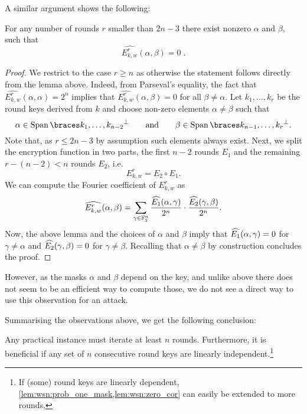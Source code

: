 A similar argument shows the following:
\begin{lemma}\label{lem:wsn:zero_cor}
    For any number of rounds $r$ smaller than $2n-3$ there exist nonzero $\alpha$ and $\beta$, such that
    \begin{equation*}
        \widehat{E_{k,w}^r}(\alpha, \beta) = 0\;.
    \end{equation*}
\end{lemma}
\begin{proof}
    We restrict to the case $r \geqslant n$ as otherwise the statement follows directly from the lemma above.
    Indeed, from Parseval's equality, the fact that $\widehat{E_{k,w}^r}(\alpha, \alpha)=2^n$ implies that $\widehat{E_{k,w}^r}(\alpha, \beta)=0$ for all $\beta \neq \alpha$.
    Let $k_1, \ldots, k_{r}$ be the round keys derived from $k$ and choose non-zero elements $\alpha \ne \beta$ such that
    \begin{equation*}
        \alpha \in \Span{k_1, \dots, k_{n-2}}^{\perp} \qquad
        \text{and} \qquad
        \beta \in \Span{k_{n-1}, \dots, k_{r}}^{\perp}.
    \end{equation*}
    Note that, as $r \le 2n-3$ by assumption such elements always exist.
    Next, we split the encryption function in two parts, the first $n-2$ rounds $E_1$ and the remaining $r-(n-2)<n$ rounds $E_2$, i.e.
    \begin{equation*}
        E_{k,w}^r = E_2 \circ E_1.
    \end{equation*}
    We can compute the Fourier coefficient of $E_{k,w}^r$ as
    \begin{equation*}
        \widehat{E_{k,w}^r}(\alpha,\beta)=\sum_{\gamma \in \mathbb{F}_2^n} \frac{\widehat{E_1}(\alpha,\gamma)}{2^n} \cdot \frac{\widehat{E_2}(\gamma,\beta)}{2^n}.
    \end{equation*}
    Now, the above lemma and the choices of $\alpha$ and $\beta$ imply that $\widehat{E_1}(\alpha,\gamma) = 0$ for $\gamma \ne \alpha$ and  $\widehat{E_2}(\gamma,\beta) = 0$ for $\gamma \ne \beta$.
    Recalling that $\alpha \ne \beta$ by construction concludes the proof.
\end{proof}

However, as the masks $\alpha$ and $\beta$ depend on the key, and unlike above there does not seem to be an efficient way to compute those, we do not see a direct way to use this observation for an attack.

Summarising the observations above, we get the following conclusion:
\begin{rationale}\label{rat:wsn:one}
    Any practical instance must iterate at least $n$ rounds.
    Furthermore, it is beneficial if any set of $n$ consecutive round keys are linearly independent.\footnote{%
        If (some) round keys are linearly dependent, \cref{lem:wsn:prob_one_mask,lem:wsn:zero_cor} can easily be extended to more rounds.
    }
\end{rationale}

